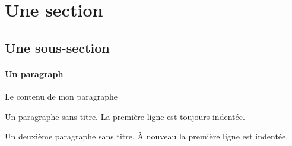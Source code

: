 \documentclass[a5paper,12pt]{scrartcl}
\begin{document}
\section{Une section}
\subsection{Une sous-section}
\paragraph{Un paragraph} Le contenu de mon paragraphe

Un paragraphe sans titre. La première ligne est toujours indentée. 

Un deuxième paragraphe sans titre. À nouveau la première ligne est indentée.
\end{document}
